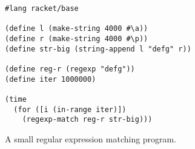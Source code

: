 \begin{figure}[!htbp]
	\centering
	\begin{minipage}{0.4\textwidth}
		\begin{lstlisting}[language=racket, basicstyle=\ttfamily\scriptsize]
#lang racket/base

(define l (make-string 4000 #\a))
(define r (make-string 4000 #\p))
(define str-big (string-append l "defg" r))

(define reg-r (regexp "defg"))
(define iter 1000000)

(time
  (for ([i (in-range iter)])
    (regexp-match reg-r str-big)))
		\end{lstlisting}
	\end{minipage}
\caption{\small A small regular expression matching program.}
\label{fig:regexp-example-defg}
\end{figure}